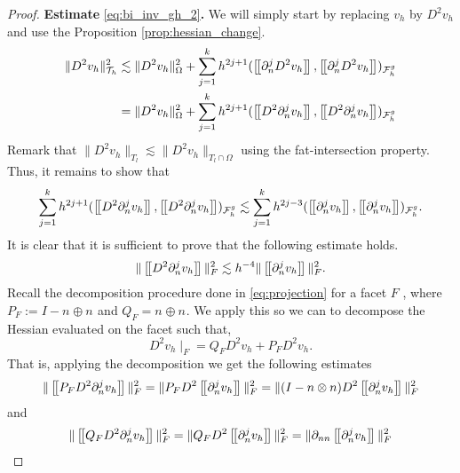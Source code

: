 \begin{proof}
        \textbf{Estimate} \eqref{eq:bi_inv_gh_2}\textbf{.}  We will simply start by replacing $v_{h}$ by $D^2 v_{h}$ and use the Proposition \ref{prop:hessian_change}.
        \begin{align}
                    \| D^2 v_{h} \|_{ \mathcal{T} _{h} }^{2  }&  \lesssim \| D^2 v_{h} \|_{ \Omega  }^{ 2 }  + \sum_{j=1}^{k} h^{2j+1} ( \jump{   \partial ^{j}_{n} D^2 v_{h} }, \jump{  \partial ^{j}_{n} D^2 v_{h}}    )_{\mathcal{F}_{h}^{g}} \\
                    &=  \| D^2 v_{h} \|_{ \Omega  }^{ 2 }  + \sum_{j=1}^{k} h^{2j+1} ( \jump{   D^2 \partial ^{j}_{n}  v_{h} }, \jump{  D^2 \partial ^{j}_{n}  v_{h}}    )_{\mathcal{F}_{h}^{g}}
        \end{align}
        Remark that $\|  D^2 v_{h} \|_{ T_{l} }^{  } \lesssim  \|  D^2 v_{h} \|_{ T_{l} \cap \Omega  }^{  }  $ using the fat-intersection property.
        Thus, it remains to show that
        \begin{equation}
        \sum_{j=1}^{k} h^{2j+1} ( \jump{   D^2 \partial ^{j}_{n}  v_{h} }, \jump{  D^2 \partial ^{j}_{n}  v_{h}}    )_{\mathcal{F}_{h}^{g}} \lesssim  \sum_{j=1}^{k} h^{2j-3} ( \jump{    \partial ^{j}_{n}  v_{h} }, \jump{  \partial ^{j}_{n}  v_{h}}
        )_{\mathcal{F}_{h}^{g}}.
        \end{equation}
        It is clear that it is sufficient to prove that the following estimate holds.
          \begin{equation}
\| \left[\!\left[    D^2 \partial ^{j}_{n}  v_{h}  \right]\!\right] \|_{F  }^{ 2 } \lesssim h^{-4} \|  \left[\!\left[  \partial ^{j}_{n} v_{h}  \right]\!\right]   \|_{ F }^{  2}.
        \end{equation}
        Recall the decomposition procedure done in \eqref{eq:projection} for a facet $F$ , where $P_{F} := I - n_{} \oplus n_{} $ and $Q_{F} = n_{} \oplus n_{}$. We apply this so we can to decompose the Hessian evaluated on the facet  such that,
        \begin{equation}
        D^2 v_{h}  \mid _{F} = Q_{F}D^2v_{h} + P_{F} D^2 v_{h} .
        \end{equation}
        That is, applying the decomposition we get the following estimates
        \begin{equation}
            \begin{split}
            \| \left[\!\left[  P_{F}   D^2 \partial _{n}^{j} v_{h}  \right]\!\right]\|_{ F }^{ 2 } & = \| P_{F} D^2 \left[\!\left[  \partial _{n}^{j} v_{h}  \right]\!\right]   \|_{ F  }^{ 2} = \| (I- n\otimes n) D^2 \left[\!\left[  \partial _{n}^{j} v_{h}  \right]\!\right]   \|_{ F  }^{ 2}    \\
            \end{split}
        \end{equation}
        and
        \begin{equation}
            \begin{split}
            \| \left[\!\left[  Q_{F}   D^2 \partial _{n}^{j} v_{h}  \right]\!\right]\|_{ F }^{ 2 } & = \| Q_{F} D^2 \left[\!\left[  \partial _{n}^{j} v_{h}  \right]\!\right]   \|_{ F  }^{ 2}  = \| \partial _{nn} \left[\!\left[  \partial _{n}^{j} v_{h}  \right]\!\right]   \|_{ F  }^{ 2}    \\
            \end{split}
        \end{equation}



\end{proof}
